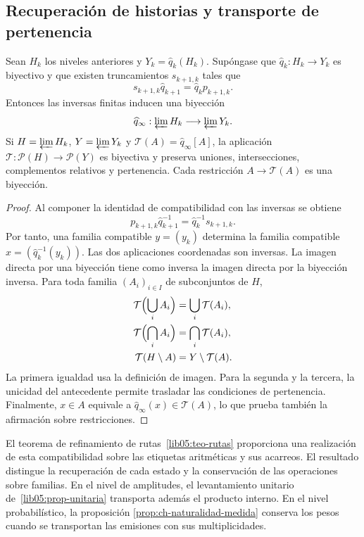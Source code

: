 \subsection{Recuperación de historias y transporte de pertenencia}
\begin{proposition}
\label{lib07:prop-familias}
Sean \(H_k\) los niveles anteriores y \(Y_k=\widehat q_k(H_k)\).
Supóngase que \(\widehat q_k:H_k\to Y_k\) es biyectivo y que existen
truncamientos \(s_{k+1,k}\) tales que
\[
 s_{k+1,k}\widehat q_{k+1}=\widehat q_k p_{k+1,k}.
\]
Entonces las inversas finitas inducen una biyección
\[
 \widehat q_\infty:\varprojlim H_k\longrightarrow\varprojlim Y_k.
\]
Si \(H=\varprojlim H_k\), \(Y=\varprojlim Y_k\) y
\(\mathcal T(A)=\widehat q_\infty[A]\), la aplicación
\(\mathcal T:\mathcal P(H)\to\mathcal P(Y)\) es biyectiva y
preserva uniones, intersecciones, complementos relativos y pertenencia.
Cada restricción \(A\to\mathcal T(A)\) es una biyección.
\end{proposition}
\begin{proof}
Al componer la identidad de compatibilidad con las inversas se obtiene
\[
 p_{k+1,k}\widehat q_{k+1}^{-1}
   =\widehat q_k^{-1}s_{k+1,k}.
\]
Por tanto, una familia compatible \(y=(y_k)\) determina la familia
compatible \(x=(\widehat q_k^{-1}(y_k))\). Las dos aplicaciones
coordenadas son inversas. La imagen directa por una biyección tiene
como inversa la imagen directa por la biyección inversa. Para toda
familia \((A_i)_{i\in I}\) de subconjuntos de \(H\),
\[
 \begin{aligned}
 \mathcal T\Bigl(\bigcup_i A_i\Bigr)&=\bigcup_i\mathcal T(A_i),\\
 \mathcal T\Bigl(\bigcap_i A_i\Bigr)&=\bigcap_i\mathcal T(A_i),\\
 \mathcal T(H\setminus A)&=Y\setminus\mathcal T(A).
 \end{aligned}
\]
La primera igualdad usa la definición de imagen. Para la segunda y
la tercera, la unicidad del antecedente permite trasladar las
condiciones de pertenencia. Finalmente,
\(x\in A\) equivale a
\(\widehat q_\infty(x)\in\mathcal T(A)\), lo que prueba también
la afirmación sobre restricciones.
\end{proof}

El teorema de refinamiento de rutas~\ref{lib05:teo-rutas}
proporciona una realización de esta compatibilidad sobre las etiquetas
aritméticas y sus acarreos. El resultado distingue la recuperación
de cada estado y la conservación de las operaciones sobre familias.
En el nivel de amplitudes, el levantamiento unitario
de~\ref{lib05:prop-unitaria} transporta además el producto interno.
En el nivel probabilístico, la proposición
\ref{prop:ch-naturalidad-medida} conserva los pesos cuando se
transportan las emisiones con sus multiplicidades.


